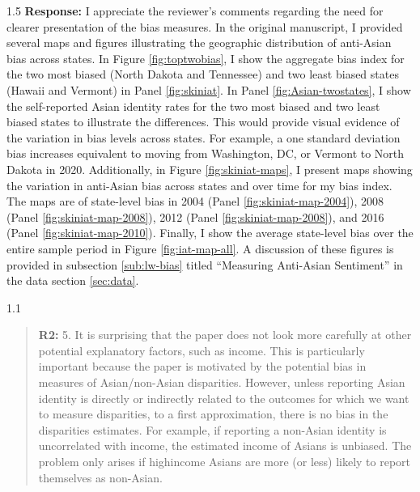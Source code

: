 \documentclass[12pt,english]{article}
\newcommand{\rrquote}{1.1}
\newcommand{\rrxspc}{1.5}
\begin{document}
\begin{refsection}
        \begin{spacing}{\rrxspc}
            \textbf{Response:} I appreciate the reviewer's comments regarding the need for clearer presentation of the bias measures. In the original manuscript, I provided several maps and figures illustrating the geographic distribution of anti-Asian bias across states. In Figure \ref{fig:toptwobias}, I show the aggregate bias index for the two most biased (North Dakota and Tennessee) and two least biased states (Hawaii and Vermont) in Panel \ref{fig:skiniat}. In Panel \ref{fig:Asian-twostates}, I show the self-reported Asian identity rates for the two most biased and two least biased states to illustrate the differences. This would provide visual evidence of the variation in bias levels across states. For example, a one standard deviation bias increases equivalent to moving from Washington, DC, or Vermont to North Dakota in 2020. Additionally, in Figure \ref{fig:skiniat-maps}, I present maps showing the variation in anti-Asian bias across states and over time for my bias index. The maps are of state-level bias in 2004 (Panel \ref{fig:skiniat-map-2004}), 2008 (Panel \ref{fig:skiniat-map-2008}), 2012 (Panel \ref{fig:skiniat-map-2008}), and 2016 (Panel \ref{fig:skiniat-map-2010}). Finally, I show the average state-level bias over the entire sample period in Figure \ref{fig:iat-map-all}. A discussion of these figures is provided in subsection \ref{sub:lw-bias} titled ``Measuring Anti-Asian Sentiment'' in the data section \ref{sec:data}.
    \end{spacing}

    \begin{spacing}{\rrquote}
        \begin{quotation}
        \textbf{R2: } 5. It is surprising that the paper does not look more carefully at other potential explanatory factors, such as income. This is particularly important because the paper is motivated by the potential bias in measures of Asian/non-Asian disparities. However, unless reporting Asian identity is directly or indirectly related to the outcomes for which we want to measure disparities, to a first approximation, there is no bias in the disparities estimates. For example, if reporting a non-Asian identity is uncorrelated with income, the estimated income of Asians is unbiased. The problem only arises if highincome Asians are more (or less) likely to report themselves as non-Asian.
        \end{quotation}
        \end{spacing}
        

\end{refsection}
\end{document}
